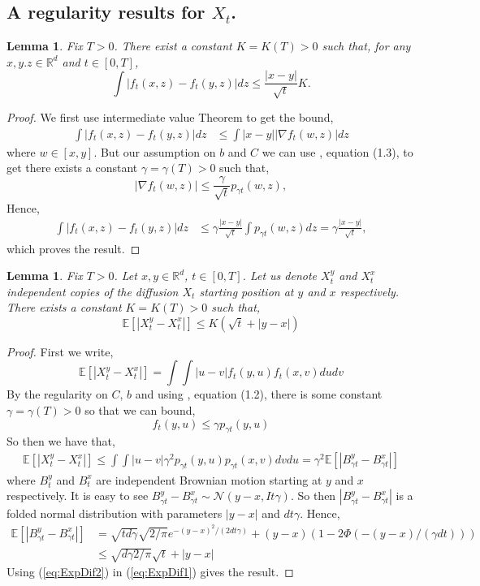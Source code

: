 \documentclass[a4paper,12pt]{article}
\newtheorem{lemma}[theorem]{Lemma}
\newcommand{\EE}{\mathbb{E}}
\newcommand{\1}{{\bf {1}}}
\begin{document}
\subsection{A regularity results for $X_t$.}
\begin{lemma} \label{regularityForX1}
Fix $T>0$. There exist a constant $K= K(T)>0$ such that, for any $x,y.z \in \mathbb{R}^d$ and $t \in [0,T]$,
\begin{equation} \label{eq:boundDensityXt}
\int |f_t(x,z)-f_t(y,z)| dz \leq \frac{|x-y|}{\sqrt{t}} K.
\end{equation}
\end{lemma}
\begin{proof}
We first use intermediate value Theorem to get the bound,
\begin{align*}
\int |f_t(x,z)-f_t(y,z)| dz & \leq \int |x-y| |\nabla f_t(w,z)| dz
\end{align*}
where $w \in [x,y]$. But our assumption on $b$ and $C$ we can use \cite{Sheu:1991}, equation (1.3), to get there exists a constant $\gamma=\gamma(T)>0$ such that,
\[ |\nabla f_t(w,z)|  \leq  \frac{\gamma }{\sqrt{t}}p_{ \gamma  t}(w,z), \]
Hence, 
\begin{align*}
\int |f_t(x,z)-f_t(y,z)| dz & \leq \gamma \frac{|x-y|}{\sqrt{t}} \int p_{\gamma  t}(w,z)dz = \gamma  \frac{|x-y|}{\sqrt{t}},
\end{align*}
which proves the result.
\end{proof}
\begin{lemma} \label{regularityForX2}
Fix $T>0$. Let $x,y \in \mathbb{R}^d$, $t \in [0,T]$. Let us denote $X_t^y$ and $X_t^x$ independent copies of the diffusion $X_t$ starting position at $y$ and $x$ respectively. There exists a constant $K=K(T)>0$ such that, 
\[ \EE[|X_t^y-X_t^x|] \leq K(\sqrt{t} + |y-x|) \]
\end{lemma}
\begin{proof}
First we write, 
\[ \EE[|X_t^y-X_t^x|]  = \int \int |u-v| f_t(y,u) f_t(x,v) du dv  \]
By the regularity on $C$, $b$ and using \cite{Sheu:1991}, equation (1.2), there is some constant $\gamma =\gamma (T)>0$ so that we can bound,
\[ f_t(y,u) \leq \gamma  p_{\gamma  t}(y,u) \]
So then we have that,
\begin{align}
  \EE[|X_t^y-X_t^x|]  \leq \int \int |u-v| \gamma ^2 p_{\gamma  t}(y,u) p_{\gamma  t}(x,v) dv du = \gamma ^2 \EE[|B_{\gamma  t}^y-B_{\gamma  t}^x|] \label{eq:ExpDif1}
\end{align}
where $B_t^y$ and $B_t^x$ are independent Brownian motion starting at $y$ and $x$ respectively. It is easy to see $B_{\gamma t} ^y-B_{\gamma t}^x \sim \mathcal{N}(y-x, It \gamma )$. So then $|B_{\gamma t} ^y-B_{\gamma t}^x|$ is a folded normal distribution with parameters $|y-x|$ and $d t \gamma $. Hence,
\begin{align}
\EE[|B_{\gamma  t}^y-B_{\gamma  t}^x|] &= \sqrt{t d \gamma } \sqrt{2/\pi} e^{-(y-x)^2/(2dt\gamma )} + (y-x) (1-2\Phi(-(y-x)/(\gamma  d t))) \nonumber \\ & \leq \sqrt{d \gamma  2/\pi}  \sqrt{t} + |y-x| \label{eq:ExpDif2}
\end{align}
Using (\ref{eq:ExpDif2}) in (\ref{eq:ExpDif1}) gives the result.
\end{proof}
\end{document}
